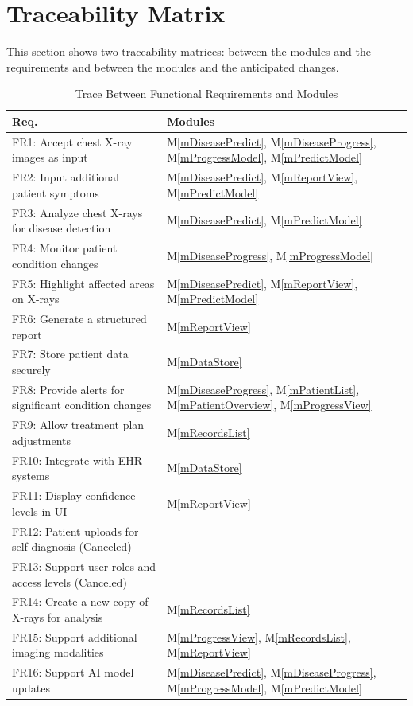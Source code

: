 \documentclass[12pt, titlepage]{article}
\newcommand{\mref}[1]{M\ref{#1}}
\begin{document}
\section{Traceability Matrix} \label{SecTM}

This section shows two traceability matrices: between the modules and the
requirements and between the modules and the anticipated changes.

\begin{table}[H]
\centering
\begin{tabular}{p{} p{}}
\toprule
\textbf{Req.} & \textbf{Modules}\\
\midrule
FR1: Accept chest X-ray images as input & \mref{mDiseasePredict}, \mref{mDiseaseProgress}, \mref{mProgressModel}, \mref{mPredictModel}\\
FR2: Input additional patient symptoms & \mref{mDiseasePredict}, \mref{mReportView}, \mref{mPredictModel}\\
FR3: Analyze chest X-rays for disease detection & \mref{mDiseasePredict}, \mref{mPredictModel}\\
FR4: Monitor patient condition changes & \mref{mDiseaseProgress}, \mref{mProgressModel}\\
FR5: Highlight affected areas on X-rays & \mref{mDiseasePredict}, \mref{mReportView}, \mref{mPredictModel}\\
FR6: Generate a structured report & \mref{mReportView}\\
FR7: Store patient data securely & \mref{mDataStore}\\
FR8: Provide alerts for significant condition changes & \mref{mDiseaseProgress}, \mref{mPatientList}, \mref{mPatientOverview}, \mref{mProgressView}\\
FR9: Allow treatment plan adjustments & \mref{mRecordsList}\\
FR10: Integrate with EHR systems & \mref{mDataStore}\\
FR11: Display confidence levels in UI & \mref{mReportView}\\
FR12: Patient uploads for self-diagnosis (Canceled) & \\
FR13: Support user roles and access levels (Canceled) & \\
FR14: Create a new copy of X-rays for analysis & \mref{mRecordsList}\\
FR15: Support additional imaging modalities & \mref{mProgressView}, \mref{mRecordsList}, \mref{mReportView}\\
FR16: Support AI model updates & \mref{mDiseasePredict}, \mref{mDiseaseProgress}, \mref{mProgressModel}, \mref{mPredictModel}\\
\bottomrule
\end{tabular}
\caption{Trace Between Functional Requirements and Modules}
\label{TblRT}
\end{table}
\end{document}
